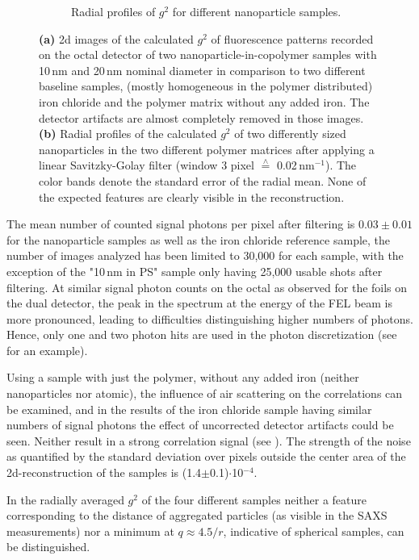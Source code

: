 \begin{figure}
\begin{subfigure}[b]{\textwidth}
\begin{subfigure}[b]{0.49\textwidth}
	\end{subfigure}
			\caption{Radial profiles of $g^2$ for different nanoparticle samples.}
			\end{subfigure}
	\label{fig:resnanorad}
	\caption[Results nanoparticles]{\textbf{(a)} 2d images of the calculated $g^2$ of fluorescence patterns recorded on the octal detector of two nanoparticle-in-copolymer samples with 10\,nm and 20\,nm nominal diameter in comparison to two different baseline samples, (mostly homogeneous in the polymer distributed) iron chloride and the polymer matrix without any added iron. The detector artifacts are almost completely removed in those images. \textbf{(b)} Radial profiles of the calculated $g^2$ of two differently sized nanoparticles in the two different polymer matrices after applying a linear Savitzky-Golay filter (window 3 pixel $\overset{\scriptscriptstyle\wedge}{=}$ 0.02\,nm$^{-1}$). The color bands denote the standard error of the radial mean. None of the expected features are clearly visible in the reconstruction. }
	\label{fig:resnano}
\end{figure}

The mean number of counted signal photons per pixel after filtering is $0.03\pm0.01$ for the nanoparticle samples as well as the iron chloride reference sample, the number of images analyzed has been limited to 30,000 for each sample, with the exception of the "10\,nm in PS" sample only having 25,000 usable shots after filtering. At similar signal photon counts on the octal as observed for the foils on the dual detector, the peak in the spectrum at the energy of the FEL beam is more pronounced, leading to difficulties distinguishing higher numbers of photons. Hence, only one and two photon hits are used in the photon discretization (see  for an example).

Using a sample with just the polymer, without any added iron (neither nanoparticles nor atomic), the influence of air scattering on the correlations can be examined, and in the results of the iron chloride sample having similar numbers of signal photons the effect of uncorrected detector artifacts could be seen. Neither result in a strong correlation signal (see ). The strength of the noise as quantified by the standard deviation over pixels outside the center area of the 2d-reconstruction of the samples is (1.4$\pm$0.1)$\cdot$10$^{-4}$.

In the radially averaged $g^2$ of the four different samples neither a feature corresponding to the distance of aggregated particles (as visible in the SAXS measurements)  nor a minimum at $q\approx4.5/r$, indicative of spherical samples, can be distinguished. 
\FloatBarrier
